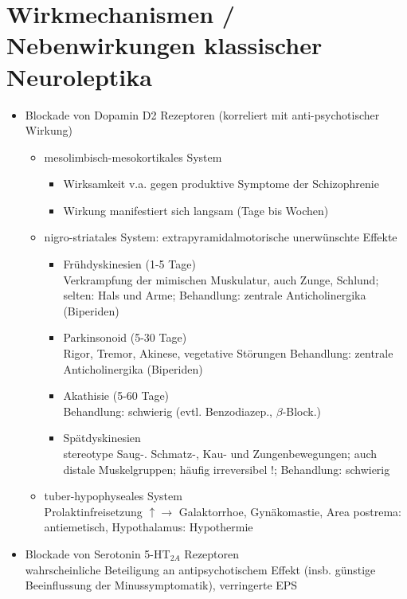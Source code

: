 \documentclass[10pt,a4paper]{report}
\begin{document}
\section{Wirkmechanismen / Nebenwirkungen klassischer Neuroleptika} %
\label{sec:wirkmechanismen_nebenwirkungen_klassischer_neuroleptika}
\begin{itemize}
	\item  Blockade von Dopamin D2 Rezeptoren (korreliert mit anti-psychotischer Wirkung)
	\begin{itemize}
		\item mesolimbisch-mesokortikales System
		\begin{itemize}
			\item Wirksamkeit v.a. gegen produktive Symptome der Schizophrenie
			\item Wirkung manifestiert sich langsam (Tage bis Wochen)
		\end{itemize}
		\item nigro-striatales System: extrapyramidalmotorische unerwünschte Effekte
		\begin{itemize}
			\item  Frühdyskinesien (1-5 Tage)\\
			Verkrampfung der mimischen Muskulatur, auch Zunge, Schlund; selten: Hals und Arme; 	Behandlung: zentrale Anticholinergika (Biperiden)
			\item Parkinsonoid (5-30 Tage)\\
			Rigor, Tremor, Akinese, vegetative Störungen
			Behandlung: zentrale Anticholinergika (Biperiden)
			\item Akathisie (5-60 Tage)\\
			Behandlung: schwierig (evtl. Benzodiazep., $\beta$-Block.)
			\item Spätdyskinesien \\
			stereotype Saug-. Schmatz-, Kau- und Zungenbewegungen; 
			auch 	distale Muskelgruppen; häufig irreversibel !; Behandlung: schwierig
		\end{itemize}
		\item tuber-hypophyseales System\\
		Prolaktinfreisetzung $\uparrow \rightarrow$ Galaktorrhoe, Gynäkomastie, Area postrema: antiemetisch, Hypothalamus: Hypothermie
	\end{itemize}
	\item Blockade von Serotonin 5-HT$_{2A}$ Rezeptoren\\
	wahrscheinliche Beteiligung an antipsychotischem Effekt (insb. günstige 	Beeinflussung der Minussymptomatik), verringerte EPS

\end{itemize}
\end{document}
